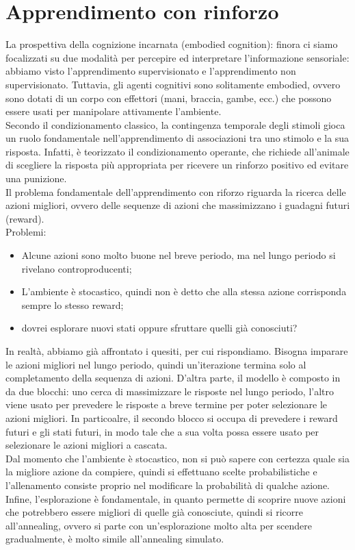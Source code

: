 \section{Apprendimento con rinforzo}

La prospettiva della cognizione incarnata (embodied cognition): finora ci siamo
focalizzati su due modalità per percepire ed interpretare l'informazione
sensoriale: abbiamo visto l'apprendimento supervisionato e l'apprendimento
non supervisionato. 
Tuttavia, gli agenti cognitivi sono solitamente embodied,
ovvero sono dotati di un corpo con effettori (mani, braccia, gambe, ecc.) che
possono essere usati per manipolare attivamente l'ambiente.\\
Secondo il condizionamento classico, la contingenza temporale degli stimoli
gioca un ruolo fondamentale nell'apprendimento di associazioni tra uno stimolo e
la sua risposta. 
Infatti, è teorizzato il condizionamento operante, che richiede
all'animale di scegliere la risposta più appropriata per ricevere un rinforzo
positivo ed evitare una punizione.\\
Il problema fondamentale dell'apprendimento con riforzo riguarda la ricerca
delle azioni migliori, ovvero delle sequenze di azioni che massimizzano i
guadagni futuri (reward).\\
Problemi:
\begin{itemize}
	\item Alcune azioni sono molto buone nel breve periodo, ma nel lungo periodo
		si rivelano controproducenti;

	\item L'ambiente è stocastico, quindi non è detto che alla stessa azione
		corrisponda sempre lo stesso reward;

	\item dovrei esplorare nuovi stati oppure sfruttare quelli già conosciuti?
\end{itemize}

In realtà, abbiamo già affrontato i quesiti, per cui rispondiamo. Bisogna
imparare le azioni migliori nel lungo periodo, quindi un'iterazione termina solo
al completamento della sequenza di azioni. D'altra parte, il modello è composto
in da due blocchi: uno cerca di massimizzare le risposte nel lungo periodo,
l'altro viene usato per prevedere le risposte a breve termine per poter
selezionare le azioni migliori. In particoalre, il secondo blocco si occupa di
prevedere i reward futuri e gli stati futuri, in modo tale che a sua volta possa
essere usato per selezionare le azioni migliori a cascata.\\
Dal momento che l'ambiente è stocastico, non si può sapere con certezza quale
sia la migliore azione da compiere, quindi si effettuano scelte probabilistiche
e l'allenamento consiste proprio nel modificare la probabilità di qualche
azione.\\
Infine, l'esplorazione è fondamentale, in quanto permette di scoprire nuove
azioni che potrebbero essere migliori di quelle già conosciute, quindi si
ricorre all'annealing, ovvero si parte con un'esplorazione molto alta per
scendere gradualmente, è molto simile all'annealing simulato.\\

